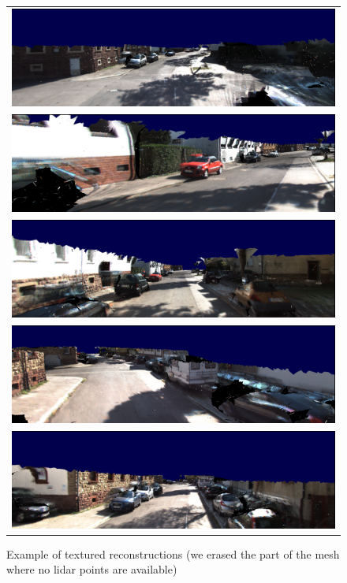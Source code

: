 \begin{figure}[tbp]
 \centering
\setlength{\tabcolsep}{1px}
    \begin{tabular}{c}
    \includegraphics[width=0.92\columnwidth]{./img/ch-laser/ModelRendering003}\\
    \includegraphics[width=0.92\columnwidth]{./img/ch-laser/ModelRendering006}\\
    \includegraphics[width=0.92\columnwidth]{./img/ch-laser/ModelRendering008}\\
    \includegraphics[width=0.92\columnwidth]{./img/ch-laser/ModelRendering013}\\
    \includegraphics[width=0.92\columnwidth]{./img/ch-laser/ModelRendering016}\\
 \end{tabular}
 \caption{Example of textured reconstructions (we erased the part of the mesh where no lidar points are available)}
 \label{fig:resultTec}
\end{figure}



